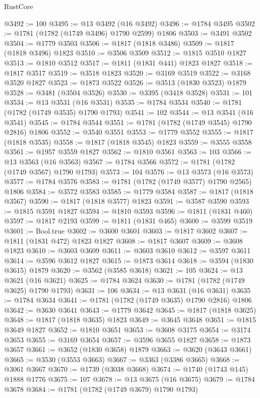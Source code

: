 \begin{lexlean}{RustCore}
\begin{coremodule}
@3492 := 100
@3495 := @13 @3492 (@16 @3492)
@3496 := @1784 @3495
@3502 := @1781 (@1782 (@1749 @3496) @1790 @2599) @1806
@3503 := @3491 @3502
@3504 := @1779 @3503
@3506 := @1817 (@1818 @3486)
@3509 := @1817 (@1818 @3496) @1823
@3510 := @3506 @3509
@3512 := @1815 @3510 @1827
@3513 := @1810 @3512
@3517 := @1811 (@1831 @441) @1823 @1827
@3518 := @1817 @3517
@3519 := @3518 @1823
@3520 := @3169 @3519
@3522 := @3168 @3520 @1827
@3523 := @1873 @3522
@3526 := @3513 (@1830 @3523) @1879
@3528 := @3481 (@3504 @3526)
@3530 := @3395 (@3418 @3528)
@3531 := 101
@3534 := @13 @3531 (@16 @3531)
@3535 := @1784 @3534
@3540 := @1781 (@1782 (@1749 @3535) @1790 @1793)
@3541 := 102
@3544 := @13 @3541 (@16 @3541)
@3545 := @1784 @3544
@3551 := @1781 (@1782 (@1749 @3545) @1790 @2816) @1806
@3552 := @3540 @3551
@3553 := @1779 @3552
@3555 := @1817 (@1818 @3535)
@3558 := @1817 (@1818 @3545) @1823
@3559 := @3555 @3558
@3561 := @1957 @3559 @1827
@3562 := @1810 @3561
@3563 := 103
@3566 := @13 @3563 (@16 @3563)
@3567 := @1784 @3566
@3572 := @1781 (@1782 (@1749 @3567) @1790 @1793)
@3573 := 104
@3576 := @13 @3573 (@16 @3573)
@3577 := @1784 @3576
@3583 := @1781 (@1782 (@1749 @3577) @1790 @2565) @1806
@3584 := @3572 @3583
@3585 := @1779 @3584
@3587 := @1817 (@1818 @3567)
@3590 := @1817 (@1818 @3577) @1823
@3591 := @3587 @3590
@3593 := @1815 @3591 @1827
@3594 := @1810 @3593
@3596 := @1811 (@1831 @460)
@3597 := @1817 @2193
@3599 := @1811 (@1831 @465)
@3600 := @3599 @3519
@3601 := Bool.true
@3602 := @3600 @3601
@3603 := @1817 @3602
@3607 := @1811 (@1831 @472) @1823 @1827
@3608 := @1817 @3607
@3609 := @3608 @1823
@3610 := @3603 @3609
@3611 := @3603 @3610
@3612 := @3597 @3611
@3614 := @3596 @3612 @1827
@3615 := @1873 @3614
@3618 := @3594 (@1830 @3615) @1879
@3620 := @3562 (@3585 @3618)
@3621 := 105
@3624 := @13 @3621 (@16 @3621)
@3625 := @1784 @3624
@3630 := @1781 (@1782 (@1749 @3625) @1790 @1793)
@3631 := 106
@3634 := @13 @3631 (@16 @3631)
@3635 := @1784 @3634
@3641 := @1781 (@1782 (@1749 @3635) @1790 @2816) @1806
@3642 := @3630 @3641
@3643 := @1779 @3642
@3645 := @1817 (@1818 @3625)
@3648 := @1817 (@1818 @3635) @1823
@3649 := @3645 @3648
@3651 := @1815 @3649 @1827
@3652 := @1810 @3651
@3653 := @3608 @3175
@3654 := @3174 @3653
@3655 := @3169 @3654
@3657 := @3596 @3655 @1827
@3658 := @1873 @3657
@3661 := @3652 (@1830 @3658) @1879
@3663 := @3620 (@3643 @3661)
@3665 := @3530 (@3553 @3663)
@3667 := @3363 (@3386 @3665)
@3668 := @3061 @3667
@3670 := @1739 (@3038 @3668)
@3674 := @1740 (@1743 @145) @1888 @1776
@3675 := 107
@3678 := @13 @3675 (@16 @3675)
@3679 := @1784 @3678
@3684 := @1781 (@1782 (@1749 @3679) @1790 @1793)

\end{coremodule}
\end{lexlean}

